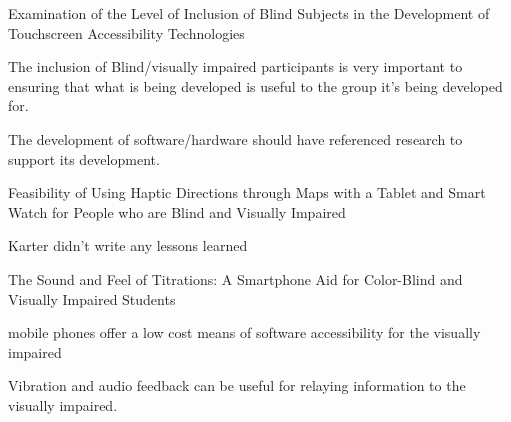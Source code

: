 \documentclass{article}
\begin{document}
Examination of the Level of Inclusion of Blind Subjects in the Development of Touchscreen Accessibility Technologies 

The inclusion of Blind/visually impaired participants is very important to ensuring that what is being developed is useful to the group it's being developed for. 

The development of software/hardware should have referenced research to support its development. 

Feasibility of Using Haptic Directions through Maps with a Tablet and Smart Watch for People who are Blind and Visually Impaired 

Karter didn’t write any lessons learned 

The Sound and Feel of Titrations: A Smartphone Aid for Color-Blind and Visually Impaired Students 

mobile phones offer a low cost means of software accessibility for the visually impaired  

Vibration and audio feedback can be useful for relaying information to the visually impaired. 




\end{document}
